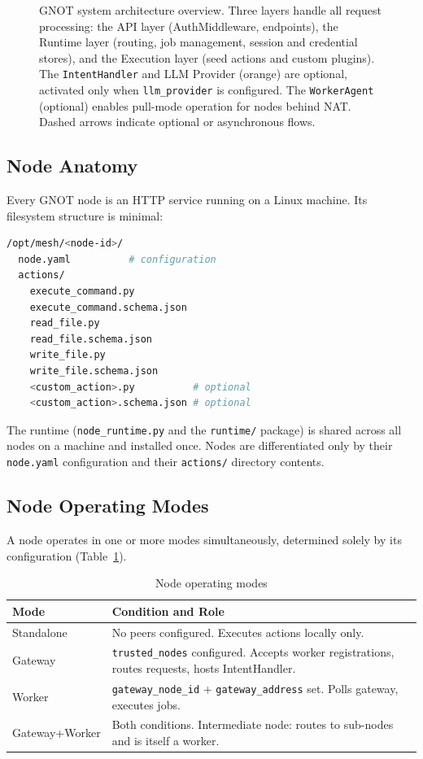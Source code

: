\documentclass[10pt,twocolumn]{article}
\begin{document}
\begin{figure}[t]
{\begin{tikzpicture}
\end{tikzpicture}
}%
\caption{GNOT system architecture overview. Three layers handle all
request processing: the API layer (AuthMiddleware, endpoints), the
Runtime layer (routing, job management, session and credential stores),
and the Execution layer (seed actions and custom plugins). The
\texttt{IntentHandler} and LLM Provider (orange) are optional,
activated only when \texttt{llm\_provider} is configured. The
\texttt{WorkerAgent} (optional) enables pull-mode operation for nodes
behind NAT. Dashed arrows indicate optional or asynchronous flows.}
\label{fig:arch}
\end{figure}

\subsection{Node Anatomy}

Every GNOT node is an HTTP service running on a Linux machine. Its
filesystem structure is minimal:

\begin{lstlisting}[language=bash, caption={Node directory structure}]
/opt/mesh/<node-id>/
  node.yaml          # configuration
  actions/
    execute_command.py
    execute_command.schema.json
    read_file.py
    read_file.schema.json
    write_file.py
    write_file.schema.json
    <custom_action>.py          # optional
    <custom_action>.schema.json # optional
\end{lstlisting}

The runtime (\texttt{node\_runtime.py} and the \texttt{runtime/} package)
is shared across all nodes on a machine and installed once. Nodes are
differentiated only by their \texttt{node.yaml} configuration and their
\texttt{actions/} directory contents.

\subsection{Node Operating Modes}

A node operates in one or more modes simultaneously, determined solely
by its configuration (Table~\ref{tab:modes}).

\begin{table}[tp]
\centering
\caption{Node operating modes}
\label{tab:modes}
\small
\begin{tabular}{@{}lp{5.2cm}@{}}
\toprule
\textbf{Mode} & \textbf{Condition and Role} \\
\midrule
Standalone & No peers configured. Executes actions locally only. \\
Gateway & \texttt{trusted\_nodes} configured. Accepts worker registrations, routes requests, hosts IntentHandler. \\
Worker & \texttt{gateway\_node\_id} + \texttt{gateway\_address} set. Polls gateway, executes jobs. \\
Gateway+Worker & Both conditions. Intermediate node: routes to sub-nodes and is itself a worker. \\
\bottomrule
\end{tabular}
\end{table}
\end{document}
